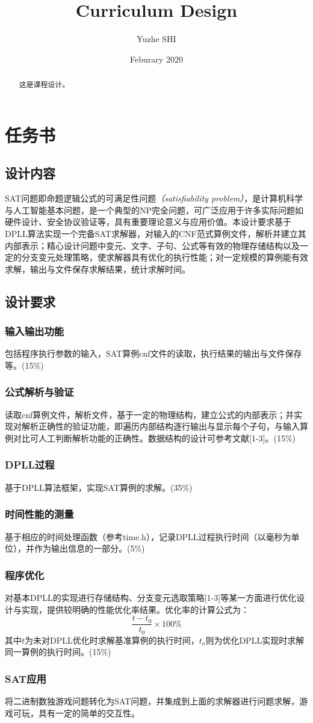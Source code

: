 \documentclass{ctexrep}
\title{Curriculum Design}
\author{Yuzhe SHI}
\date{Feburary 2020}
\begin{document}
\maketitle


  
\begin{abstract}
   这是课程设计。 
\end{abstract}
\chapter{任务书}
\section{设计内容}
SAT问题即命题逻辑公式的可满足性问题\textit{（satisfiability problem）}，是计算机科学与人工智能基本问题，是一个典型的NP完全问题，可广泛应用于许多实际问题如硬件设计、安全协议验证等，具有重要理论意义与应用价值。本设计要求基于DPLL算法实现一个完备SAT求解器，对输入的CNF范式算例文件，解析并建立其内部表示；精心设计问题中变元、文字、子句、公式等有效的物理存储结构以及一定的分支变元处理策略，使求解器具有优化的执行性能；对一定规模的算例能有效求解，输出与文件保存求解结果，统计求解时间。    
\section{设计要求}
\subsection{输入输出功能}
包括程序执行参数的输入，SAT算例cnf文件的读取，执行结果的输出与文件保存等。(15\%)
\subsection{公式解析与验证}
读取cnf算例文件，解析文件，基于一定的物理结构，建立公式的内部表示；并实现对解析正确性的验证功能，即遍历内部结构逐行输出与显示每个子句，与输入算例对比可人工判断解析功能的正确性。数据结构的设计可参考文献[1-3]。(15\%)
\subsection{DPLL过程}
基于DPLL算法框架，实现SAT算例的求解。(35\%)
\subsection{时间性能的测量}
基于相应的时间处理函数（参考time.h），记录DPLL过程执行时间（以毫秒为单位），并作为输出信息的一部分。(5\%)
\subsection{程序优化}
对基本DPLL的实现进行存储结构、分支变元选取策略[1-3]等某一方面进行优化设计与实现，提供较明确的性能优化率结果。优化率的计算公式为：
\begin{equation}
    \frac{t-t_0}{t_0}\times 100\%
\end{equation}
其中$t$为未对DPLL优化时求解基准算例的执行时间，$t_o$则为优化DPLL实现时求解同一算例的执行时间。(15\%)
\subsection{SAT应用}
将二进制数独游戏问题转化为SAT问题，并集成到上面的求解器进行问题求解，游戏可玩，具有一定的简单的交互性。

\tableofcontents  
\end{document}
